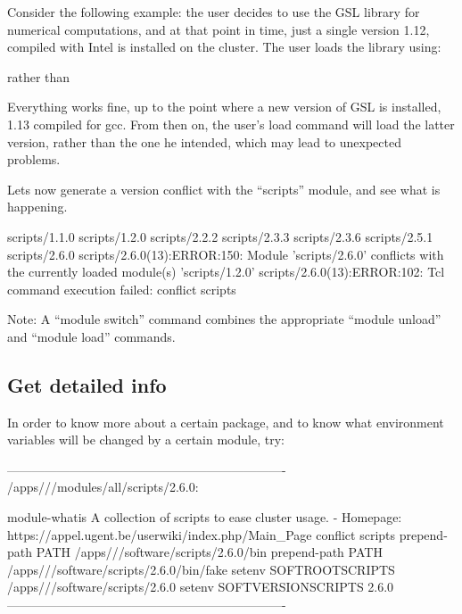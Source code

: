 Consider the following example: the user decides to use the GSL library for
numerical computations, and at that point in time, just a single version 1.12,
compiled with Intel is installed on the cluster. The user loads the library
using:

\begin{prompt}
\end{prompt}
rather than
\begin{prompt}
\end{prompt}

Everything works fine, up to the point where a new version of GSL is installed,
1.13 compiled for gcc. From then on, the user's load command will load the
latter version, rather than the one he intended, which may lead to unexpected
problems.

Lets now generate a version conflict with the ``scripts'' module, and see what
is happening.

\begin{prompt}
scripts/1.1.0
scripts/1.2.0
scripts/2.2.2
scripts/2.3.3
scripts/2.3.6
scripts/2.5.1
scripts/2.6.0
scripts/2.6.0(13):ERROR:150: Module 'scripts/2.6.0' conflicts with the currently loaded module(s) 'scripts/1.2.0'
scripts/2.6.0(13):ERROR:102: Tcl command execution failed: conflict scripts
\end{prompt}

Note: A ``module switch'' command combines the appropriate ``module unload''
and ``module load'' commands.

\subsection{Get detailed info}

In order to know more about a certain package, and to know what environment
variables will be changed by a certain module, try:

\begin{prompt}
-------------------------------------------------------------------
/apps/\site/\hpcname/modules/all/scripts/2.6.0:

module-whatis  A collection of scripts to ease cluster usage. - Homepage: https://appel.ugent.be/userwiki/index.php/Main_Page 
conflict       scripts 
prepend-path   PATH /apps/\site/\hpcname/software/scripts/2.6.0/bin 
prepend-path   PATH /apps/\site/\hpcname/software/scripts/2.6.0/bin/fake 
setenv         SOFTROOTSCRIPTS /apps/\site/\hpcname/software/scripts/2.6.0 
setenv         SOFTVERSIONSCRIPTS 2.6.0 
-------------------------------------------------------------------
\end{prompt}

